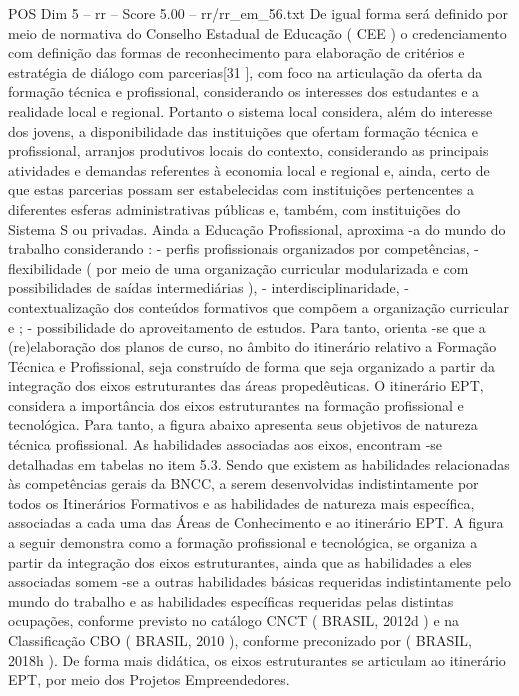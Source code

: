 \begin{textsample}{POS Dim 5 – rr – Score 5.00 – rr/rr\_em\_56.txt}
De igual forma será definido por meio de normativa do Conselho Estadual de Educação ( CEE ) o credenciamento com definição das formas de reconhecimento para elaboração de critérios e estratégia de diálogo com parcerias[31 ], com foco na articulação da oferta da formação técnica e profissional, considerando os interesses dos estudantes e a realidade local e regional.
Portanto o sistema local considera, além do interesse dos jovens, a disponibilidade das instituições que ofertam formação técnica e profissional, arranjos produtivos locais do contexto, considerando as principais atividades e demandas referentes à economia local e regional e, ainda, certo de que estas parcerias possam ser estabelecidas com instituições pertencentes a diferentes esferas administrativas públicas e, também, com instituições do Sistema S ou privadas.
Ainda a Educação Profissional, aproxima -a do mundo do trabalho considerando : - perfis profissionais organizados por competências, - flexibilidade ( por meio de uma organização curricular modularizada e com possibilidades de saídas intermediárias ), - interdisciplinaridade, - contextualização dos conteúdos formativos que compõem a organização curricular e ; - possibilidade do aproveitamento de estudos.
Para tanto, orienta -se que a (re)elaboração dos planos de curso, no âmbito do itinerário relativo a Formação Técnica e Profissional, seja construído de forma que seja organizado a partir da integração dos eixos estruturantes das áreas propedêuticas.
O itinerário EPT, considera a importância dos eixos estruturantes na formação profissional e tecnológica.
Para tanto, a figura abaixo apresenta seus objetivos de natureza técnica profissional.
As habilidades associadas aos eixos, encontram -se detalhadas em tabelas no item 5.3.
Sendo que existem as habilidades relacionadas às competências gerais da BNCC, a serem desenvolvidas indistintamente por todos os Itinerários Formativos e as habilidades de natureza mais específica, associadas a cada uma das Áreas de Conhecimento e ao itinerário EPT.
A figura a seguir demonstra como a formação profissional e tecnológica, se organiza a partir da integração dos eixos estruturantes, ainda que as habilidades a eles associadas somem -se a outras habilidades básicas requeridas indistintamente pelo mundo do trabalho e as habilidades específicas requeridas pelas distintas ocupações, conforme previsto no catálogo CNCT ( BRASIL, 2012d ) e na Classificação CBO ( BRASIL, 2010 ), conforme preconizado por ( BRASIL, 2018h ).
De forma mais didática, os eixos estruturantes se articulam ao itinerário EPT, por meio dos Projetos Empreendedores.

\end{textsample}
